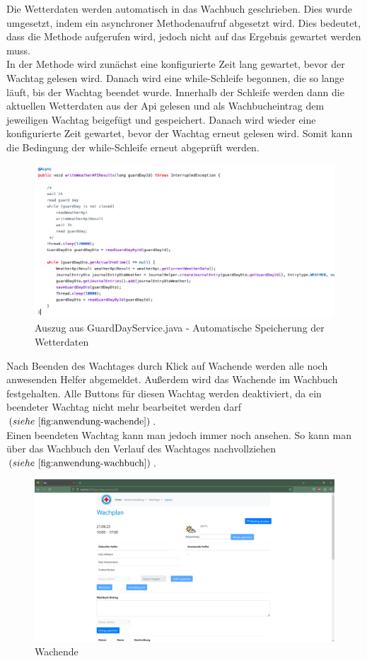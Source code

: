 \documentclass[fontsize=12pt,openright,oneside,paper=a4,BCOR=1cm]{scrbook}
\begin{document}
Die Wetterdaten werden automatisch in das Wachbuch geschrieben. Dies wurde umgesetzt, indem ein asynchroner Methodenaufruf abgesetzt wird. Dies bedeutet, dass die Methode aufgerufen wird, jedoch nicht auf das Ergebnis gewartet werden muss. \\
In der Methode wird zun\"achst eine konfigurierte Zeit lang gewartet, bevor der Wachtag gelesen wird. Danach wird eine while-Schleife begonnen, die so lange l\"auft, bis der Wachtag beendet wurde. Innerhalb der Schleife werden dann die aktuellen Wetterdaten aus der Api gelesen und als Wachbucheintrag dem jeweiligen Wachtag beigef\"ugt und gespeichert. Danach wird wieder eine konfigurierte Zeit gewartet, bevor der Wachtag erneut gelesen wird. Somit kann die Bedingung der while-Schleife erneut abgepr\"uft werden. 

\begin{figure}[H]
  \centering
    \includegraphics[width=0.7\linewidth]{Anlagen/Code/weatherApiAsync.png}
    \caption{Auszug aus GuardDayService.java - Automatische Speicherung der Wetterdaten}
  \label{fig:code-weatherapi}
\end{figure}
 
Nach Beenden des Wachtages durch Klick auf \glqq Wachende\grqq{} werden alle noch anwesenden Helfer abgemeldet. Au{\ss}erdem wird das Wachende im Wachbuch festgehalten. Alle Buttons f\"ur diesen Wachtag werden deaktiviert, da ein beendeter Wachtag nicht mehr bearbeitet werden darf $(siehe~\ref{fig:anwendung-wachende})$. \\
Einen beendeten Wachtag kann man jedoch immer noch ansehen. So kann man \"uber das Wachbuch den Verlauf des Wachtages nachvollziehen $(siehe~\ref{fig:anwendung-wachbuch})$.

\begin{figure}[H]
  \centering
    \includegraphics[width=0.7\linewidth]{Anlagen/Anwendung/8-5WachtagWachende.png}
    \caption{Wachende}
  \label{fig:anwendung-wachende}
\end{figure}
\end{document}
